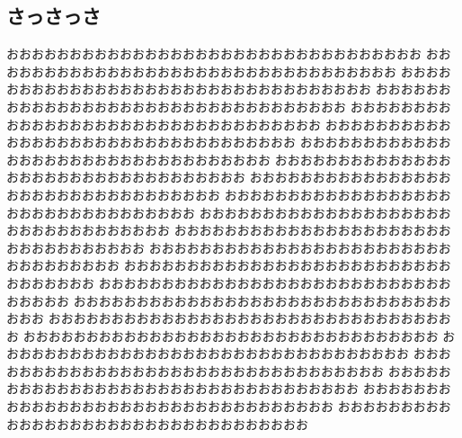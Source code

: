 \documentclass{jbook}
\begin{document}
\begin{nomarginparseprule}
\mbox{}
\section{さっさっさ}
\mbox{}
\end{nomarginparseprule}
おおおおおおおおおおおおおおおおおおおおおおおおおおおおおおおおお
おおおおおおおおおおおおおおおおおおおおおおおおおおおおおおおおお
おおおおおおおおおおおおおおおおおおおおおおおおおおおおおおおおお
おおおおおおおおおおおおおおおおおおおおおおおおおおおおおおおおお
おおおおおおおおおおおおおおおおおおおおおおおおおおおおおおおおお
おおおおおおおおおおおおおおおおおおおおおおおおおおおおおおおおお
おおおおおおおおおおおおおおおおおおおおおおおおおおおおおおおおお
おおおおおおおおおおおおおおおおおおおおおおおおおおおおおおおおお
おおおおおおおおおおおおおおおおおおおおおおおおおおおおおおおおお
おおおおおおおおおおおおおおおおおおおおおおおおおおおおおおおおお
おおおおおおおおおおおおおおおおおおおおおおおおおおおおおおおおお
おおおおおおおおおおおおおおおおおおおおおおおおおおおおおおおおお
おおおおおおおおおおおおおおおおおおおおおおおおおおおおおおおおお
おおおおおおおおおおおおおおおおおおおおおおおおおおおおおおおおお
おおおおおおおおおおおおおおおおおおおおおおおおおおおおおおおおお
おおおおおおおおおおおおおおおおおおおおおおおおおおおおおおおおお
おおおおおおおおおおおおおおおおおおおおおおおおおおおおおおおおお
おおおおおおおおおおおおおおおおおおおおおおおおおおおおおおおおお
おおおおおおおおおおおおおおおおおおおおおおおおおおおおおおおおお
おおおおおおおおおおおおおおおおおおおおおおおおおおおおおおおおお
おおおおおおおおおおおおおおおおおおおおおおおおおおおおおおおおお
おおおおおおおおおおおおおおおおおおおおおおおおおおおおおおおおお
おおおおおおおおおおおおおおおおおおおおおおおおおおおおおおおおお
\cleardoublepage
\end{document}
